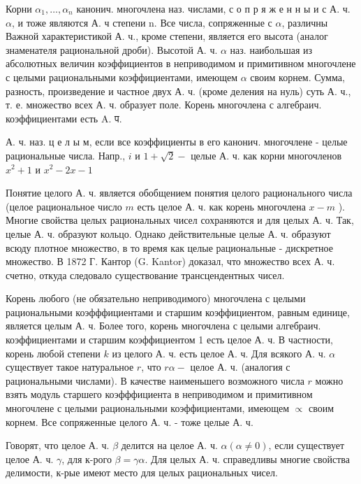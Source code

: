 \documentclass[10pt]{article}
\begin{document}
Корни $\alpha_{1}, \ldots, \alpha_{n}$ канонич. многочлена наз. числами, с о п р я ж е н н ы и с А. ч. $\alpha$, и тоже являются А. ч степени n. Все числа, сопряженные с $\alpha$, различны Важной характеристикой А. ч., кроме степени, является его высота (аналог знаменателя рациональной дроби). Высотой А. ч. $\alpha$ наз. наибольшая из абсолютных величин коэффициентов в неприводимом и примитивном многочлене с целыми рациональными коэффициентами, имеющем $\alpha$ своим корнем. Сумма, разность, произведение и частное двух А. ч. (кроме деления на нуль) суть А. ч., т. е. множество всех А. ч. образует поле. Корень многочлена с алгебраич. коэффициентами есть A. प.



А. ч. наз. ц е л ы м, если все коэффициенты в его канонич. многочлене - целые рациональные числа. Напр., $i$ и $1+\sqrt{2}-$ целые А. ч. как корни многочленов $x^{2}+1$ и $x^{2}-2 x-1$



Понятие целого А. ч. является обобщением понятия целого рационального числа (целое рациональное число $m$ есть целое А. ч. как корень многочлена $x-m$ ). Многие свойства целых рациональных чисел сохраняются и для целых А. ч. Так, целые А. ч. образуют кольцо. Однако действительные целые А. ч. образуют всюду плотное множество, в то время как целые рациональные - дискретное множество. В 1872 Г. Кантор (G. Kantor) доказал, что множество всех А. ч. счетно, откуда следовало существование трансцендентных чисел.



Корень любого (не обязательно неприводимого) многочлена с целыми рациональными коэфффициентами и старшим коэффициентом, равным единице, является целым А. ч. Более того, корень многочлена с целыми алгебраич. коэффициентами и старшим коэффициентом 1 есть целое А. ч. В частности, корень любой степени $k$ из целого А. ч. есть целое А. ч. Для всякого А. ч. $\alpha$ существует такое натуральное $r$, что $r \alpha-$ целое А. ч. (аналогия с рациональными числами). В качестве наименьшего возможного числа $r$ можно взять модуль старшего коэфффициента в неприводимом и примитивном многочлене с целыми рациональными коэффициентами, имеющем $\propto$ своим корнем. Все сопряженные целого А. ч. - тоже целые А. ч.



Говорят, что целое А. ч. $\beta$ делится на целое А. ч. $\alpha(\alpha \neq 0)$, если существует целое А. ч. $\gamma$, для к-рого $\beta=\gamma \alpha$. Для целых А. ч. справедливы многие свойства делимости, к-рые имеют место для целых рациональных чисел.
\end{document}
